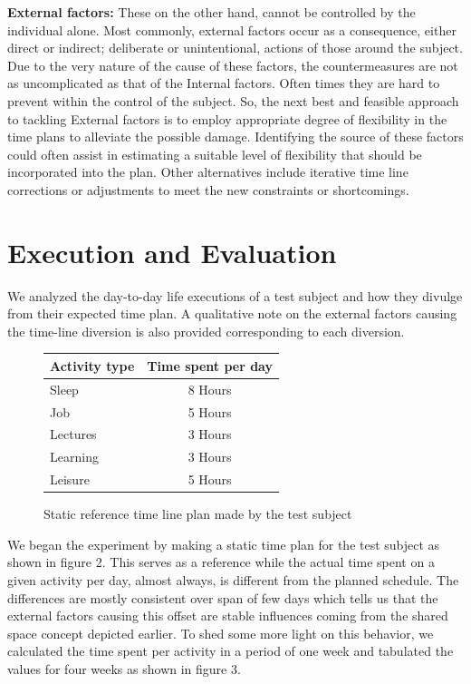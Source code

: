 \documentclass[conference]{IEEEtran}
\begin{document}
\textbf{External factors:} These on the other hand, cannot be controlled by the individual alone. Most commonly, external factors occur as a consequence, either direct or indirect; deliberate or unintentional, actions of those around the subject. Due to the very nature of the cause of these factors, the countermeasures are not as uncomplicated as that of the Internal factors. Often times they are hard to prevent within the control of the subject. So, the next best and feasible approach to tackling External factors is to employ appropriate degree of flexibility in the time plans to alleviate the possible damage. Identifying the source of these factors could often assist in estimating a suitable level of flexibility that should be incorporated into the plan. Other alternatives include iterative time line corrections or adjustments to meet the new constraints or shortcomings.


\section{Execution and Evaluation}
We analyzed the day-to-day life executions of a test subject and how they divulge from their expected time plan. A qualitative note on the external factors causing the time-line diversion is also provided corresponding to each diversion.


\begin{figure}[hb]
  \centering
  \renewcommand{\arraystretch}{2}
	  \begin{tabular}{ | l | c | }
		\hline
		\textbf{Activity type} 	& \textbf{Time spent per day} 	\\ \hline
		Sleep					& 	8 Hours						\\ \hline
		Job						& 	5 Hours						\\ \hline
		Lectures				& 	3 Hours						\\ \hline
		Learning				& 	3 Hours						\\ \hline
		Leisure					& 	5 Hours						\\ \hline
	  \end{tabular}
  \caption[]
   {Static reference time line plan made by the test subject}
\end{figure}

We began the experiment by making a static time plan for the test subject as shown in figure 2. This serves as a reference while the actual time spent on a given activity per day, almost always, is different from the planned schedule. The differences are mostly consistent over span of few days which tells us that the external factors causing this offset are stable influences coming from the shared space concept depicted earlier. To shed some more light on this behavior, we calculated the time spent per activity in a period of one week and tabulated the values for four weeks as shown in figure 3. 
\end{document}
